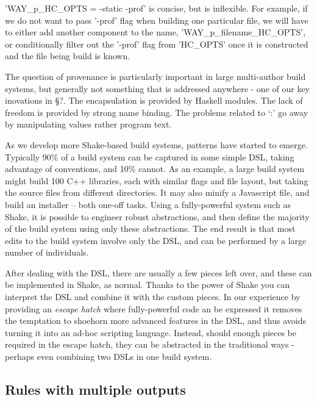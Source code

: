 \lst'WAY_p_HC_OPTS = -static -prof' is concise, but is inflexible. For example,
if we do not want to pass \lst'-prof' flag when building one particular file, we
will have to either add another component to the name,
\lst'WAY_p_filename_HC_OPTS', or conditionally filter out the \lst'-prof' flag from
\lst'HC_OPTS' once it is constructed and the file being build is known.


The question of provenance is particularly important in large multi-author build
systems, but generally not something that is addressed anywhere - one of our key
inovations in \S?. The encapsulation is provided by Haskell modules. The lack of
freedom is provided by strong name binding. The problems related to `:' go away
by manipulating values rather program text.


As we develop more Shake-based build systems, patterns have started to emerge.
Typically 90\% of a build system can be captured in some simple DSL, taking
advantage of conventions, and 10\% cannot. As an example, a large build system
might build 100 C++ libraries, each with similar flags and file layout, but
taking the source files from different directories. It may also minify a
Javascript file, and build an installer -- both one-off tasks. Using a
fully-powerful system such as Shake, it is possible to engineer robust
abstractions, and then define the majority of the build system using only these
abstractions. The end result is that most edits to the build system involve only
the DSL, and can be performed by a large number of individuals.

After dealing with the DSL, there are usually a few pieces left over, and these
can be implemented in Shake, as normal. Thanks to the power of Shake you can
interpret the DSL and combine it with the custom pieces. In our experience by
providing an \emph{escape hatch} where fully-powerful code an be expressed it
removes the temptation to shoehorn more advanced features in the DSL, and thus
avoids turning it into an ad-hoc scripting language. Instead, should enough
pieces be required in the escape hatch, they can be abstracted in the
traditional ways - perhaps even combining two DSLs in one build system.

\subsection{Rules with multiple outputs\label{sec:multiple-outputs}}

